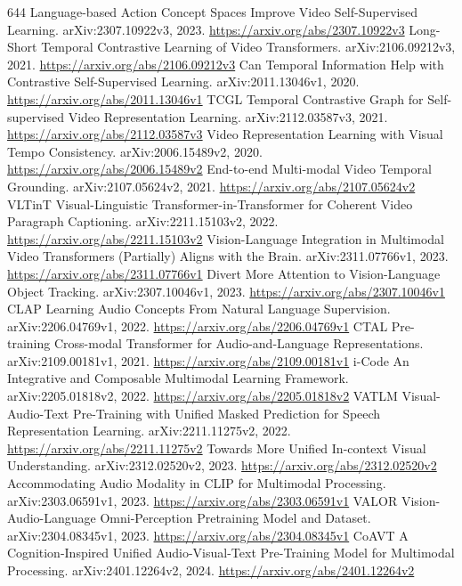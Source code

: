 \documentclass[11pt]{article}
\begin{document}
\begin{thebibliography}{644}
 Language-based Action Concept Spaces Improve Video Self-Supervised Learning. arXiv:2307.10922v3, 2023. \url{https://arxiv.org/abs/2307.10922v3}
 Long-Short Temporal Contrastive Learning of Video Transformers. arXiv:2106.09212v3, 2021. \url{https://arxiv.org/abs/2106.09212v3}
 Can Temporal Information Help with Contrastive Self-Supervised Learning. arXiv:2011.13046v1, 2020. \url{https://arxiv.org/abs/2011.13046v1}
 TCGL Temporal Contrastive Graph for Self-supervised Video Representation Learning. arXiv:2112.03587v3, 2021. \url{https://arxiv.org/abs/2112.03587v3}
 Video Representation Learning with Visual Tempo Consistency. arXiv:2006.15489v2, 2020. \url{https://arxiv.org/abs/2006.15489v2}
 End-to-end Multi-modal Video Temporal Grounding. arXiv:2107.05624v2, 2021. \url{https://arxiv.org/abs/2107.05624v2}
 VLTinT Visual-Linguistic Transformer-in-Transformer for Coherent Video Paragraph Captioning. arXiv:2211.15103v2, 2022. \url{https://arxiv.org/abs/2211.15103v2}
 Vision-Language Integration in Multimodal Video Transformers (Partially) Aligns with the Brain. arXiv:2311.07766v1, 2023. \url{https://arxiv.org/abs/2311.07766v1}
 Divert More Attention to Vision-Language Object Tracking. arXiv:2307.10046v1, 2023. \url{https://arxiv.org/abs/2307.10046v1}
 CLAP Learning Audio Concepts From Natural Language Supervision. arXiv:2206.04769v1, 2022. \url{https://arxiv.org/abs/2206.04769v1}
 CTAL Pre-training Cross-modal Transformer for Audio-and-Language Representations. arXiv:2109.00181v1, 2021. \url{https://arxiv.org/abs/2109.00181v1}
 i-Code An Integrative and Composable Multimodal Learning Framework. arXiv:2205.01818v2, 2022. \url{https://arxiv.org/abs/2205.01818v2}
 VATLM Visual-Audio-Text Pre-Training with Unified Masked Prediction for Speech Representation Learning. arXiv:2211.11275v2, 2022. \url{https://arxiv.org/abs/2211.11275v2}
 Towards More Unified In-context Visual Understanding. arXiv:2312.02520v2, 2023. \url{https://arxiv.org/abs/2312.02520v2}
 Accommodating Audio Modality in CLIP for Multimodal Processing. arXiv:2303.06591v1, 2023. \url{https://arxiv.org/abs/2303.06591v1}
 VALOR Vision-Audio-Language Omni-Perception Pretraining Model and Dataset. arXiv:2304.08345v1, 2023. \url{https://arxiv.org/abs/2304.08345v1}
 CoAVT A Cognition-Inspired Unified Audio-Visual-Text Pre-Training Model for Multimodal Processing. arXiv:2401.12264v2, 2024. \url{https://arxiv.org/abs/2401.12264v2}

\end{thebibliography}
\end{document}
